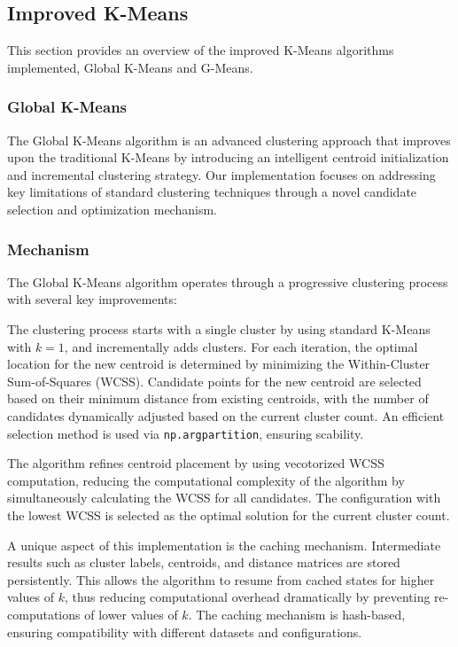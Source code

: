 \subsection{Improved K-Means}
\label{subsec:methods-improved-kmeans}

This section provides an overview of the improved K-Means algorithms implemented, Global K-Means and G-Means.

\subsubsection{Global K-Means}
\label{subsec:globalkmeansdiscussion}

The Global K-Means algorithm is an advanced clustering approach that improves upon the traditional K-Means by introducing an intelligent centroid initialization and incremental clustering strategy.
Our implementation focuses on addressing key limitations of standard clustering techniques through a novel candidate selection and optimization mechanism.

\subsubsection*{Mechanism}
The Global K-Means algorithm operates through a progressive clustering process with several key improvements:

The clustering process starts with a single cluster by using standard K-Means with \(k=1\), and incrementally adds clusters.
For each iteration, the optimal location for the new centroid is determined by minimizing the Within-Cluster Sum-of-Squares (WCSS).
Candidate points for the new centroid are selected based on their minimum distance from existing centroids, with the
number of candidates dynamically adjusted based on the current cluster count. An efficient selection method is
used via \texttt{np.argpartition}, ensuring scability.

The algorithm refines centroid placement by using vecotorized WCSS computation, reducing the computational
complexity of the algorithm by simultaneously calculating the WCSS for all candidates. The configuration with the lowest
WCSS is selected as the optimal solution for the current cluster count.

A unique aspect of this implementation is the caching mechanism. Intermediate results such as cluster labels, centroids, and
distance matrices are stored persistently. This allows the algorithm to resume from cached states for higher values of \(k\),
thus reducing computational overhead dramatically by preventing re-computations of lower values of \(k\).
The caching mechanism is hash-based, ensuring compatibility with different datasets and configurations.

